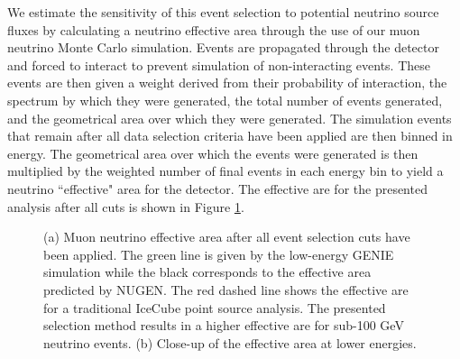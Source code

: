 \documentclass{gatech-thesis}
\begin{document}
We estimate the sensitivity of this event selection to potential neutrino source fluxes by calculating a neutrino effective area through the use of our muon neutrino Monte Carlo simulation. Events are propagated through the detector and forced to interact to prevent simulation of non-interacting events. These events are then given a weight derived from their probability of interaction, the spectrum by which they were generated, the total number of events generated, and the geometrical area over which they were generated. The simulation events that remain after all data selection criteria have been applied are then binned in energy. The geometrical area over which the events were generated is then multiplied by the weighted number of final events in each energy bin to yield a neutrino ``effective" area for the detector. The effective are for the presented analysis after all cuts is shown in Figure \ref{fig:EffAreaFinal}.
\begin{figure}\label{fig:EffAreaFinal}
\centering
{}
\caption{(a) Muon neutrino effective area after all event selection cuts have been applied. The green line is given by the low-energy GENIE simulation while the black corresponds to the effective area predicted by NUGEN. The red dashed line shows the effective are for a traditional IceCube point source analysis. The presented selection method results in a higher effective are for sub-100 GeV neutrino events. (b) Close-up of the effective area at lower energies.} 
\end{figure}
\end{document}
